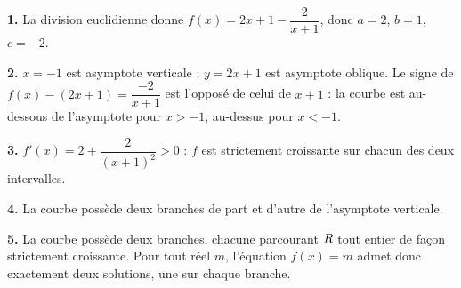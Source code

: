 \begin{corrige}
\textbf{1.} La division euclidienne donne $f(x) = 2x+1-\dfrac{2}{x+1}$, donc
$a=2$, $b=1$, $c=-2$.

\textbf{2.} $x = -1$ est asymptote verticale ; $y = 2x+1$ est asymptote
oblique. Le signe de $f(x)-(2x+1) = \dfrac{-2}{x+1}$ est l'opposé de celui de
$x+1$ : la courbe est au-dessous de l'asymptote pour $x > -1$, au-dessus pour
$x < -1$.

\textbf{3.} $f'(x) = 2 + \dfrac{2}{(x+1)^{2}} > 0$ : $f$ est strictement
croissante sur chacun des deux intervalles.

\textbf{4.} La courbe possède deux branches de part et d'autre de
l'asymptote verticale.

\textbf{5.} La courbe possède deux branches, chacune parcourant $R$ tout
entier de façon strictement croissante. Pour tout réel $m$, l'équation
$f(x)=m$ admet donc exactement deux solutions, une sur chaque branche.
\end{corrige}
